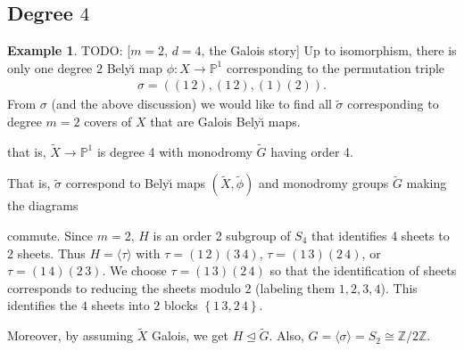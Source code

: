 \documentclass[oneside, reqno, 12pt]{amsart}
\theoremstyle{definition}
\newtheorem{example} [thm] {Example}
\theoremstyle{remark}
\newcommand{\Z}{\mathbb Z}
\newcommand{\wt}{\widetilde}
\newcommand{\PP}{\mathbb P}
\newcommand{\todo}[1]{{\color{red} \sf TODO: [#1]}}
\newcommand{\Belyi}{Bely\u{\i} }
\begin{document}
{  \subsection{Degree $4$}{
    \begin{example}
      \todo{$m=2$, $d=4$, the Galois story}
      Up to isomorphism,
      there is only one degree $2$
      \Belyi map $\phi:X\to\PP^1$ corresponding to the
      permutation triple
      \begin{align*}
        \sigma = \left( (1\,2),(1\,2),(1)(2) \right).
      \end{align*}
      From $\sigma$ (and the above discussion)
      we would like to find all $\wt{\sigma}$
      corresponding to degree $m=2$ covers of $X$
      that are Galois \Belyi maps.
      \begin{notes}
        that is,
        $\wt{X}\to\PP^1$
        is degree 4 with monodromy
        $\wt{G}$ having order 4.
      \end{notes}
      That is,
      $\wt{\sigma}$ correspond to \Belyi maps $(\wt{X},\wt{\phi})$
      and monodromy groups $\wt{G}$ making the diagrams
      \begin{center}
        \quad
        \quad
        \quad
      \end{center}
      commute.
      Since $m=2$,
      $H$ is an order 2 subgroup of $S_4$
      that identifies 4 sheets to 2 sheets.
      Thus $H = \langle\tau\rangle$ with
      $\tau = (1\,2)(3\,4)$, $\tau = (1\,3)(2\,4)$, or $\tau = (1\,4)(2\,3)$.
      We choose $\tau = (1\,3)(2\,4)$ so that the identification
      of sheets corresponds to reducing the sheets modulo $2$
      (labeling them $1,2,3,4$).
      This identifies the $4$ sheets into $2$ blocks
      $\left\{\boxed{1\,3},\boxed{2\,4}\right\}$.
      \par
      Moreover, by assuming $\wt{X}$ Galois,
      we get
      $H\trianglelefteq\wt{G}$.
      Also, $G = \langle \sigma \rangle = S_2\cong\Z/2\Z$.

\end{example}}}
\end{document}
